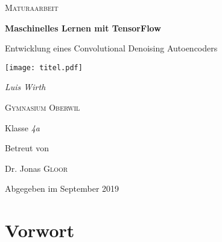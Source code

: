 
\begin{titlepage}
  \pagecolor{black}
  \color{white}

  \centering

  {\scshape\LARGE Maturaarbeit\par}
  \vspace{1cm}
  {\huge\bfseries Maschinelles Lernen mit TensorFlow\par}
  \vspace{0.2cm}
  {\large Entwicklung eines Convolutional Denoising Autoencoders\par}
  \vfill
  \texttt{[image: titel.pdf]} \par
  \vspace{1cm}
  {\Large\itshape Luis Wirth\par}
  \vfill
  \vspace{2cm}
  {\scshape\Large Gymnasium Oberwil\par}
  {\large Klasse \textit{4a}\par}
  \vspace{2cm}
  Betreut von\par
  Dr. Jonas \textsc{Gloor}

  \vfill
  {\large Abgegeben im September 2019\par}
\end{titlepage}

\pagecolor{pagecolor}
\color{textcolor}

\tableofcontents

\pagebreak


\chapter*{Vorwort}
